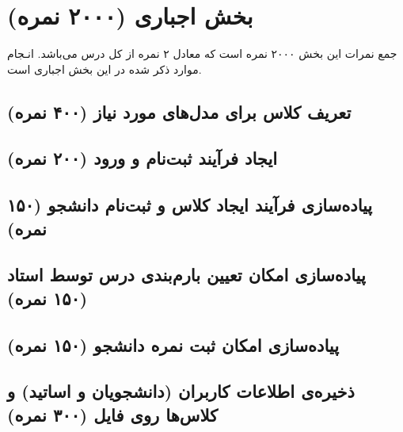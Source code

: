 \documentclass[a4paper]{report}
\begin{document}


\newpage
\tableofcontents

\newpage



\chapter{بخش اجباری (۲۰۰۰ نمره)}
\begin{center}
    \begin{warningbox}
        \Large
        جمع نمرات این بخش ۲۰۰۰ نمره است که معادل ۲ نمره از کل درس می‌باشد.
        انـجام موارد ذکر شده در این بخش اجباری است.
    \end{warningbox}
\end{center}

\section{تعریف کلاس برای مدل‌های مورد نیاز (۴۰۰ نمره)}


\section{ایجاد فرآیند ثبت‌نام و ورود (۲۰۰ نمره)}


\section{پیاده‌سازی فرآیند ایجاد کلاس و ثبت‌نام دانشجو (۱۵۰ نمره)}


\section{پیاده‌سازی امکان تعیین بارم‌بندی درس توسط استاد (۱۵۰ نمره)}


\section{پیاده‌سازی امکان ثبت نمره دانشجو (۱۵۰ نمره)}


\section{ذخیره‌ی اطلاعات کاربران (دانشجویان و اساتید) و کلاس‌ها روی فایل (۳۰۰ نمره)}

\end{document}
